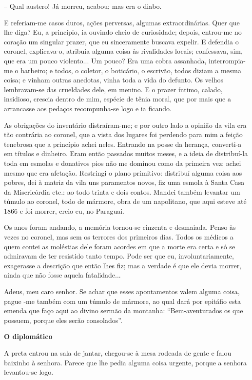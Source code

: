 -- Qual austero! Já morreu, acabou; mas era o diabo.

E referiam-me casos duros, ações perversas, algumas extraordinárias.
Quer que lhe diga? Eu, a princípio, ia ouvindo cheio de curiosidade;
depois, entrou-me no coração um singular prazer, que eu sinceramente
buscava expelir. E defendia o coronel, explicava-o, atribuía alguma
coisa às rivalidades locais; confessava, sim, que era um pouco
violento... Um pouco? Era uma cobra assanhada, interrompia-me o
barbeiro; e todos, o coletor, o boticário, o escrivão, todos diziam a
mesma coisa; e vinham outras anedotas, vinha toda a vida do defunto. Os
velhos lembravam-se das crueldades dele, em menino. E o prazer íntimo,
calado, insidioso, crescia dentro de mim, espécie de tênia moral, que
por mais que a arrancasse aos pedaços recompunha-se logo e ia ficando.

As obrigações do inventário distraíram-me; e por outro lado a opinião da
vila era tão contrária ao coronel, que a vista dos lugares foi perdendo
para mim a feição tenebrosa que a princípio achei neles. Entrando na
posse da herança, converti-a em títulos e dinheiro. Eram então passados
muitos meses, e a ideia de distribuí-la toda em esmolas e donativos pios
não me dominou como da primeira vez; achei mesmo que era afetação.
Restringi o plano primitivo: distribuí alguma coisa aos pobres, dei à
matriz da vila uns paramentos novos, fiz uma esmola à Santa Casa da
Misericórdia etc.: ao todo trinta e dois contos. Mandei também levantar
um túmulo ao coronel, todo de mármore, obra de um napolitano, que aqui
esteve até 1866 e foi morrer, creio eu, no Paraguai.

Os anos foram andando, a memória tornou-se cinzenta e desmaiada. Penso
às vezes no coronel, mas sem os terrores dos primeiros dias. Todos os
médicos a quem contei as moléstias dele foram acordes em que a morte era
certa e só se admiravam de ter resistido tanto tempo. Pode ser que eu,
involuntariamente, exagerasse a descrição que então lhes fiz; mas a
verdade é que ele devia morrer, ainda que não fosse aquela fatalidade...

Adeus, meu caro senhor. Se achar que esses apontamentos valem alguma
coisa, pague -me também com um túmulo de mármore, ao qual dará por
epitáfio esta emenda que faço aqui ao divino sermão da montanha:
``Bem-aventurados os que possuem, porque eles serão consolados''.

\textbf{O diplomático}

A preta entrou na sala de jantar, chegou-se à mesa rodeada de gente e
falou baixinho à senhora. Parece que lhe pedia alguma coisa urgente,
porque a senhora levantou-se logo.

